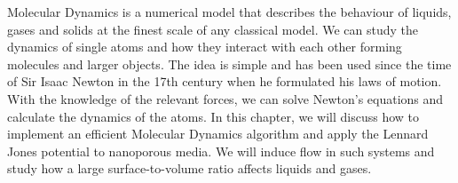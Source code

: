 Molecular Dynamics is a numerical model that describes the behaviour of liquids, gases and solids at the finest scale of any classical model. We can study the dynamics of single atoms and how they interact with each other forming molecules and larger objects. The idea is simple and has been used since the time of Sir Isaac Newton in the 17th century when he formulated his laws of motion. With the knowledge of the relevant forces, we can solve Newton's equations and calculate the dynamics of the atoms. In this chapter, we will discuss how to implement an efficient Molecular Dynamics algorithm and apply the Lennard Jones potential to nanoporous media. We will induce flow in such systems and study how a large surface-to-volume ratio affects liquids and gases. 



